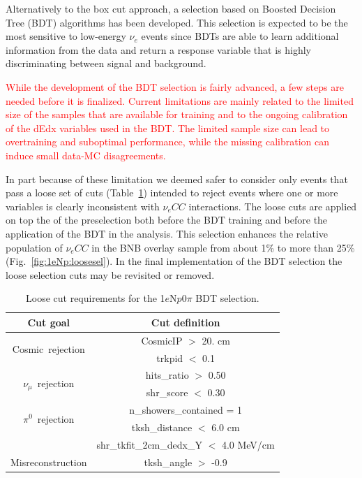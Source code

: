 \documentclass[a4paper]{article}
\newcommand{\nue}{$\nu_e$ }
\newcommand{\nuecc}{$\nu_e CC$ }
\newcommand{\npsel}{1$e$N$p$0$\pi$ }
\begin{document}
Alternatively to the box cut approach, a selection based on Boosted Decision Tree (BDT) algorithms has been developed. This selection is expected to be the most sensitive to low-energy \nue events since BDTs are able to learn additional information from the data and return a response variable that is highly discriminating between signal and background. 

\textcolor{red}{While the development of the BDT selection is fairly advanced, a few steps are needed before it is finalized. Current limitations are mainly related to the limited size of the samples that are available for training and to the ongoing calibration of the dEdx variables used in the BDT. The limited sample size can lead to overtraining and suboptimal performance, while the missing calibration can induce small data-MC disagreements.} 

In part because of these limitation we deemed safer to consider only events that pass a loose set of cuts (Table~\ref{tab:1eNp:loosecut}) intended to reject events where one or more variables is clearly inconsistent with \nuecc interactions. The loose cuts are applied on top the of the preselection both before the BDT training and before the application of the BDT in the analysis. This selection enhances the relative population of \nuecc in the BNB overlay sample from about 1\% to more than 25\% (Fig.~\ref{fig:1eNp:loosesel}). In the final implementation of the BDT selection the loose selection cuts may be revisited or removed.
\begin{table}[h!]
\centering
\setlength{\tabcolsep}{10pt}
\renewcommand{\arraystretch}{1.25}
 \begin{tabular}{| c | c |} 
 \hline
 Cut goal & Cut definition \\
 \hline\hline
\multirow{2}{*}{Cosmic~rejection} & CosmicIP $>$ 20. \si{\cm} \\
& trkpid $<$ 0.1 \\
 \hline
\multirow{2}{*}{$\nu_\mu$~rejection} & hits\_ratio $>$ 0.50 \\
 & shr\_score $<$ 0.30 \\
 \hline
\multirow{2}{*}{$\pi^0$~rejection} & n\_showers\_contained = 1 \\
& tksh\_distance $<$ 6.0 \si{\cm} \\
& shr\_tkfit\_2cm\_dedx\_Y $<$ 4.0 \si{\MeV}/\si{\cm} \\
 \hline
Misreconstruction & tksh\_angle $>$ -0.9 \\
 \hline
 \end{tabular}
 \caption{\label{tab:1eNp:loosecut} Loose cut requirements for the \npsel BDT selection.}
\end{table}
\end{document}
